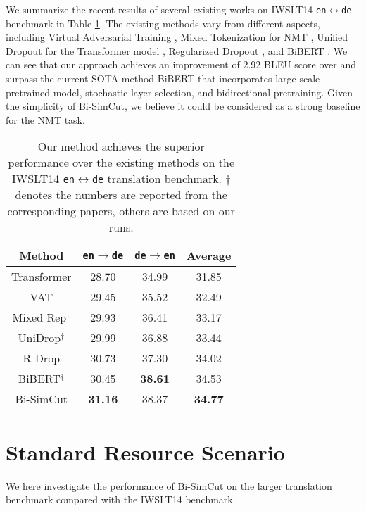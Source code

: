 \documentclass[11pt]{article}
\begin{document}
We summarize the recent results of several existing works on IWSLT14 \texttt{en}$\leftrightarrow$\texttt{de} benchmark in Table \ref{benchmark}. The existing methods vary from different aspects, including Virtual Adversarial Training \cite{sano2019effective}, Mixed Tokenization for NMT \cite{wu2020sequence}, Unified Dropout for the Transformer model \cite{wu2021unidrop}, Regularized Dropout \cite{liang2021r}, and BiBERT \cite{xu-etal-2021-bert}. We can see that our approach achieves an improvement of $2.92$ BLEU score over \citet{vaswani2017attention} and surpass the current SOTA method BiBERT that incorporates large-scale pretrained model, stochastic layer selection, and bidirectional pretraining. Given the simplicity of Bi-SimCut, we believe it could be considered as a strong baseline for the NMT task.

\begin{table}
\centering
\begin{tabular}{c|c|c|c}
\hline
Method & \texttt{en}$\rightarrow$\texttt{de} & \texttt{de}$\rightarrow$\texttt{en} & Average \\
\hline\hline
Transformer & 28.70 & 34.99 & 31.85 \\
VAT & 29.45 & 35.52 & 32.49 \\
Mixed Rep$^{\dagger}$ & 29.93 & 36.41 & 33.17 \\
UniDrop$^{\dagger}$ & 29.99 & 36.88 & 33.44\\
R-Drop & 30.73 & 37.30 & 34.02 \\
BiBERT$^{\dagger}$ & 30.45 & \bf 38.61 & 34.53 \\
\hline
Bi-SimCut & \bf 31.16 & 38.37 & \bf 34.77 \\
\end{tabular}
\caption{Our method achieves the superior performance over the existing methods on the IWSLT14 \texttt{en}$\leftrightarrow$\texttt{de} translation benchmark. $\dagger$ denotes the numbers are reported from the corresponding papers, others are based on our runs. \label{benchmark}}
\end{table}


\section{Standard Resource Scenario}\label{standard-resource}

We here investigate the performance of Bi-SimCut on the larger translation benchmark compared with the IWSLT14 benchmark.
\end{document}
